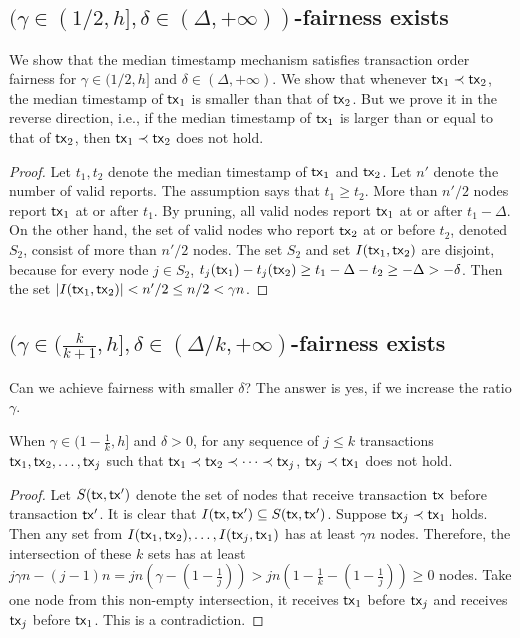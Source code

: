\documentclass[runningheads]{llncs}
\begin{document}
\subsection{$(\gamma\in(1/2,h], \delta\in(\Delta,+\infty))$-fairness exists}
We show that the median timestamp mechanism satisfies transaction order fairness for $\gamma\in(1/2,h]$ and $\delta\in(\Delta,+\infty)$. We show that whenever $\mathsf{tx}_1\prec \mathsf{tx}_2$, the median timestamp of $\mathsf{tx}_1$ is smaller than that of $\mathsf{tx}_2$. But we prove it in the reverse direction, i.e., if the median timestamp of $\mathsf{tx}_1$ is larger than or equal to that of $\mathsf{tx}_2$, then $\mathsf{tx}_1\prec \mathsf{tx}_2$ does not hold. 

\begin{proof}
    Let $t_1, t_2$ denote the median timestamp of $\mathsf{tx}_1$ and $\mathsf{tx}_2$. Let $n'$ denote the number of valid reports. The assumption says that $t_1\ge t_2$. More than $n'/2$ nodes report $\mathsf{tx}_1$ at or after $t_1$. By pruning, all valid nodes report $\mathsf{tx}_1$ at or after $t_1-\Delta$. On the other hand, the set of valid nodes who report $\mathsf{tx}_2$ at or before $t_2$, denoted $S_2$, consist of more than $n'/2$ nodes. The set $S_2$ and set $I(\mathsf{tx}_1, \mathsf{tx}_2)$ are disjoint, because for every node $j\in S_2$, $t_j(\mathsf{tx}_1) - t_j(\mathsf{tx}_2)\ge t_1 - \Delta -t_2 \ge -\Delta > -\delta$. Then the set $|I(\mathsf{tx}_1,\mathsf{tx}_2)| < n'/2 \le n/2 < \gamma n$.   
\end{proof}

\subsection{$(\gamma\in(\frac{k}{k+1}, h], \delta\in (\Delta/k, +\infty)$-fairness exists}
Can we achieve fairness with smaller $\delta$? The answer is yes, if we increase the ratio $\gamma$. 

\begin{lemma}
When $\gamma\in (1-\frac{1}{k}, h]$ and $\delta > 0$, for any sequence of $j\le k$ transactions $\mathsf{tx}_1, \mathsf{tx}_2, \dots, \mathsf{tx}_{j}$ such that $\mathsf{tx}_1\prec \mathsf{tx}_2\prec \cdots \prec \mathsf{tx}_{j}$, $\mathsf{tx}_{j}\prec \mathsf{tx}_1$ does not hold. 
\end{lemma}

\begin{proof}
    Let $S(\mathsf{tx}, \mathsf{tx}')$ denote the set of nodes that receive transaction $\mathsf{tx}$ before transaction $\mathsf{tx}'$. It is clear that $I(\mathsf{tx}, \mathsf{tx}')\subseteq S(\mathsf{tx}, \mathsf{tx}')$. Suppose $\mathsf{tx}_j\prec\mathsf{tx}_1$ holds. Then any set from $I(\mathsf{tx}_1,\mathsf{tx}_2), \dots, I(\mathsf{tx}_{j}, \mathsf{tx}_{1})$ has at least $\gamma n$ nodes. Therefore, the intersection of these $k$ sets has at least $j\gamma n - (j-1) n = jn(\gamma - (1-\frac{1}{j})) > jn(1-\frac{1}{k} - (1-\frac{1}{j})) \ge 0$ nodes. Take one node from this non-empty intersection, it receives $\mathsf{tx}_1$ before $\mathsf{tx}_j$ and receives $\mathsf{tx}_j$ before $\mathsf{tx}_1$. This is a contradiction. 
\end{proof}
\end{document}
